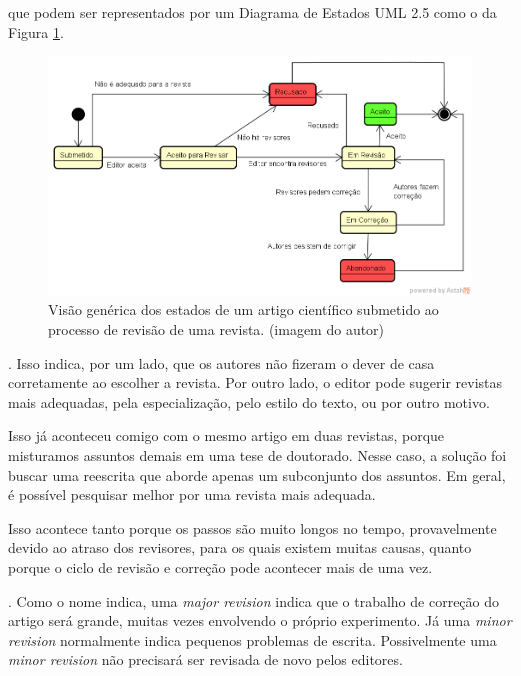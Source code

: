 \documentclass[openany]{book}
\begin{document}
 que podem ser representados por um Diagrama  de Estados UML 2.5 como o da Figura \ref{fig:maquina}.

\begin{figure}
    \centering
    \includegraphics[width=0.7\linewidth]{imagens/MaquinaEstadoArtigo.png}
    \caption[Visão genérica dos estados de um artigo científico]{Visão genérica dos estados de um artigo científico submetido ao processo de revisão de uma revista. (imagem do autor)}
    \label{fig:maquina}
\end{figure}

. Isso indica, por um lado, que os autores não fizeram o dever de casa corretamente ao escolher a revista. Por outro lado, o editor pode sugerir revistas mais adequadas, pela especialização, pelo estilo do texto, ou por outro motivo.


 Isso já aconteceu comigo com o mesmo artigo em duas revistas, porque misturamos assuntos demais em uma tese de doutorado. Nesse caso, a solução foi buscar uma reescrita que aborde apenas um subconjunto dos assuntos. Em geral, é possível pesquisar melhor por uma revista mais adequada.

 Isso acontece tanto porque os passos são muito longos no tempo, provavelmente devido ao atraso dos revisores, para os quais existem muitas causas, quanto porque o ciclo de revisão e correção pode acontecer mais de uma vez.

. Como o nome indica, uma \textit{major revision} indica que o trabalho de correção do artigo será grande, muitas vezes envolvendo o próprio experimento. Já uma \textit{minor revision} normalmente indica pequenos problemas de escrita. Possivelmente uma \textit{minor revision} não precisará ser revisada de novo pelos editores.
\end{document}
